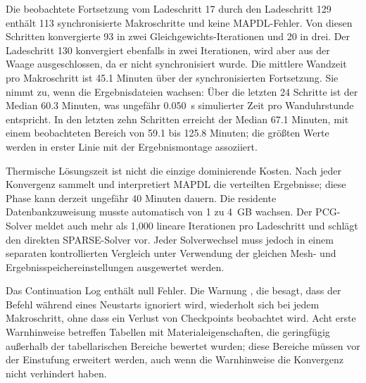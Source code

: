 \documentclass[oneside,openany]{amsdtx}
\begin{document}
Die beobachtete Fortsetzung vom Ladeschritt 17 durch den Ladeschritt 129 enthält 113 synchronisierte Makroschritte und keine MAPDL-Fehler. Von diesen Schritten konvergierte 93 in zwei Gleichgewichts-Iterationen und 20 in drei. Der Ladeschritt 130 konvergiert ebenfalls in zwei Iterationen, wird aber aus der Waage ausgeschlossen, da er nicht synchronisiert wurde. Die mittlere Wandzeit pro Makroschritt ist 45.1 Minuten über der synchronisierten Fortsetzung. Sie nimmt zu, wenn die Ergebnisdateien wachsen: Über die letzten 24 Schritte ist der Median 60.3 Minuten, was ungefähr \SI{0.050}{s} simulierter Zeit pro Wanduhrstunde entspricht. In den letzten zehn Schritten erreicht der Median 67.1 Minuten, mit einem beobachteten Bereich von 59.1 bis 125.8 Minuten; die größten Werte werden in erster Linie mit der Ergebnismontage assoziiert.

Thermische Lösungszeit ist nicht die einzige dominierende Kosten. Nach jeder Konvergenz sammelt und interpretiert MAPDL die verteilten Ergebnisse; diese Phase kann derzeit ungefähr 40 Minuten dauern. Die residente Datenbankzuweisung musste automatisch von 1 zu 4~GB wachsen. Der PCG-Solver meldet auch mehr als 1,000 lineare Iterationen pro Ladeschritt und schlägt den direkten SPARSE-Solver vor. Jeder Solverwechsel muss jedoch in einem separaten kontrollierten Vergleich unter Verwendung der gleichen Mesh- und Ergebnisspeichereinstellungen ausgewertet werden.

Das Continuation Log enthält null Fehler. Die Warnung , die besagt, dass der Befehl während eines Neustarts ignoriert wird, wiederholt sich bei jedem Makroschritt, ohne dass ein Verlust von Checkpoints beobachtet wird. Acht erste Warnhinweise betreffen Tabellen mit Materialeigenschaften, die geringfügig außerhalb der tabellarischen Bereiche bewertet wurden; diese Bereiche müssen vor der Einstufung erweitert werden, auch wenn die Warnhinweise die Konvergenz nicht verhindert haben.
\end{document}
